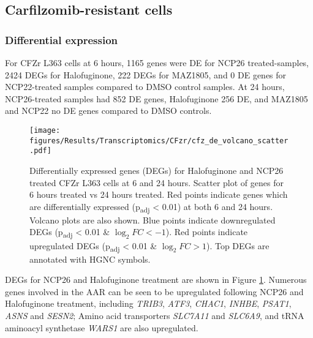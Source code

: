 
\afterpage{\clearpage}
\subsection{Carfilzomib-resistant cells}

\subsubsection{Differential expression}
For CFZr L363 cells at 6 hours, 1165 genes were DE for NCP26 treated-samples, 2424 DEGs for Halofuginone, 222 DEGs for MAZ1805, and 0 DE genes for NCP22-treated samples compared to DMSO control samples.
At 24 hours, NCP26-treated samples had 852 DE genes, Halofuginone 256 DE, and MAZ1805 and NCP22 no DE genes compared to DMSO controls.
\begin{figure}[bht]
\centering
\texttt{[image: figures/Results/Transcriptomics/CFzr/cfz\_de\_volcano\_scatter.pdf]}
\caption[Differentially expressed genes CFZr L363 cells]{Differentially expressed genes (DEGs) for Halofuginone and NCP26 treated CFZr L363 cells at 6 and 24 hours.
Scatter plot of genes for 6 hours treated vs 24 hours treated.
Red points indicate genes which are differentially expressed (p\textsubscript{adj} < 0.01) at both 6 and 24 hours.
Volcano plots are also shown.
Blue points indicate downregulated DEGs (p\textsubscript{adj} < 0.01 \& $\log_{2}FC < -1$).
Red points indicate upregulated DEGs (p\textsubscript{adj} < 0.01 \& $\log_{2}FC > 1$).
Top DEGs are annotated with HGNC symbols.
}
\label{fig:cfz_de}
\end{figure}
DEGs for NCP26 and Halofuginone treatment are shown in Figure \ref{fig:cfz_de}.
Numerous genes involved in the AAR can be seen to be upregulated following NCP26 and Halofuginone treatment, including \textit{TRIB3}, \textit{ATF3}, \textit{CHAC1}, \textit{INHBE}, \textit{PSAT1}, \textit{ASNS} and \textit{SESN2};
Amino acid transporters \textit{SLC7A11} and \textit{SLC6A9}, and tRNA aminoacyl synthetase \textit{WARS1} are also upregulated.


